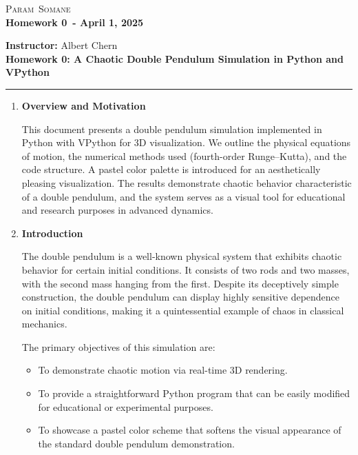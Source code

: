 \documentclass[letterpaper,12pt]{article}
\newcommand{\myFirstName}{Param}
\newcommand{\myLastName}{Somane}
\def\homeworknum{0}
\def\duedate{April 1, 2025}
\begin{document}
\begin{center}
  {\color{darkgreen}\Large{\scshape \myFirstName \ \myLastName}} \\
  {\bf Homework \homeworknum\ - \duedate}
\end{center}

\vspace*{0.3cm}

\noindent
\textbf{Instructor:} Albert Chern \\
\textbf{Homework \homeworknum: A Chaotic Double Pendulum Simulation in Python and VPython}\\
\rule{\textwidth}{0.4pt}

\begin{enumerate}[leftmargin=*, itemsep=1em]

\item \textbf{Overview and Motivation}

This document presents a double pendulum simulation implemented in Python with VPython for 3D visualization. We outline the physical equations of motion, the numerical methods used (fourth-order Runge–Kutta), and the code structure. A pastel color palette is introduced for an aesthetically pleasing visualization. The results demonstrate chaotic behavior characteristic of a double pendulum, and the system serves as a visual tool for educational and research purposes in advanced dynamics.

\item \textbf{Introduction}

The double pendulum is a well-known physical system that exhibits chaotic behavior for certain initial conditions. It consists of two rods and two masses, with the second mass hanging from the first. Despite its deceptively simple construction, the double pendulum can display highly sensitive dependence on initial conditions, making it a quintessential example of chaos in classical mechanics.

The primary objectives of this simulation are:
\begin{itemize}
    \item To demonstrate chaotic motion via real-time 3D rendering.
    \item To provide a straightforward Python program that can be easily modified for educational or experimental purposes.
    \item To showcase a pastel color scheme that softens the visual appearance of the standard double pendulum demonstration.
\end{itemize}


\end{enumerate}
\end{document}
